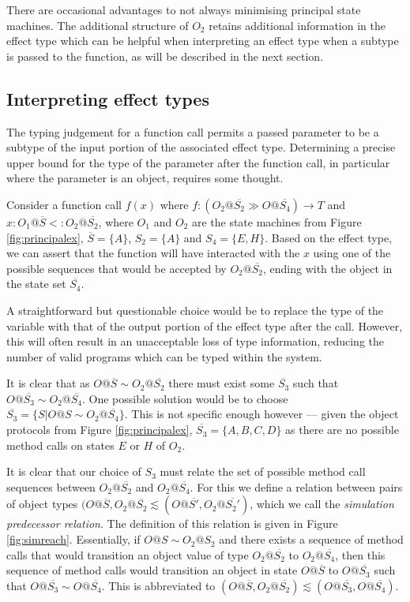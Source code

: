 \documentclass[preprint]{sigplanconf}
\makeatletter
\newcommand{\figref}[1]{Figure \ref{#1}}
\newcommand{\ot}[2]{#1@\overline{#2}}
\makeatother
\begin{document}
There are occasional advantages to not always minimising principal state
machines. The additional structure of $O_2$ retains additional information
in the effect type which can be helpful when interpreting an effect type
when a subtype is passed to the function, as will be described in the next
section.

\subsection{Interpreting effect types}

The typing judgement for a function call permits a passed parameter to
be a subtype of the input portion of the associated effect type.
Determining a precise upper bound for the type of the parameter after the
function call, in particular where the parameter is an object, 
requires some thought.

Consider a function call $f(x)$ where
$f : (O_2@\overline{S_2} \gg O@\overline{S_4}) \rightarrow T$ and
$x : O_1@\overline{S} <: O_2@\overline{S_2}$, where $O_1$ and $O_2$
are the state machines from \figref{fig:principalex}, 
$\overline{S} = \{ A \}$, $S_2 = \{ A \}$ and $S_4 = \{E, H\}$. 
Based on the effect type,
we can assert that the function will have interacted with the $x$ using
one of the possible sequences that would be accepted by $O_2@\overline{S_2}$,
ending with the object in the state set $\overline{S_4}$. 

A straightforward but questionable choice would 
be to replace the type of the variable
with that of the output portion of the effect type after the call. However,
this will often result in an unacceptable loss of type information,
reducing the number of valid programs which can be typed within the system.

It is clear that as $\ot{O}{S} \sim \ot{O_2}{S_2}$ there must exist some
$\overline{S_3}$ such that $\ot{O}{S_3} \sim \ot{O_2}{S_4}$.
One possible solution would be to choose
$\overline{S_3} = \{ S | O@S \sim \ot{O_2}{S_4} \}$. This is not specific
enough however --- given the object protocols from \figref{fig:principalex},
$\overline{S_3} = \{ A, B, C, D \}$ as there are no possible method calls
on states $E$ or $H$ of $O_2$.

It is clear that our choice of $S_3$ must relate the set of possible method
call sequences between $\ot{O_2}{S_2}$ and $\ot{O_2}{S_4}$. For this we
define a relation between pairs of object types
$(O@\overline{S}, O_2@\overline{S_2} \lesssim 
(O@\overline{S'}, O_2@\overline{S_2'})$, which we call the
{\it simulation predecessor relation}. The definition of this relation
is given in \figref{fig:simreach}. Essentially, if $O@S \sim O_2@S_2$ and there
exists a sequence of method calls that would transition an object value of type
$O_2@\overline{S_2}$ to $O_2@\overline{S_4}$, then this sequence of method calls
would transition an object in state $O@\overline{S}$ to $O@\overline{S_3}$
such that $O@\overline{S_3} \sim O@\overline{S_4}$. This is abbreviated to
$(O@\overline{S}, O_2@\overline{S_2}) \lesssim (O@\overline{S_3}, O@\overline{S_4})$.
\end{document}

